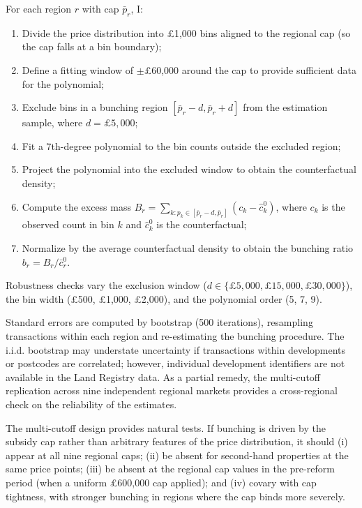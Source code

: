 \documentclass[12pt]{article}
\begin{document}
For each region $r$ with cap $\bar{p}_r$, I:
\begin{enumerate}
\item Divide the price distribution into \pounds1,000 bins aligned to the regional cap (so the cap falls at a bin boundary);
\item Define a fitting window of $\pm$\pounds60,000 around the cap to provide sufficient data for the polynomial;
\item Exclude bins in a bunching region $[\bar{p}_r - d, \bar{p}_r + d]$ from the estimation sample, where $d = \pounds5{,}000$;
\item Fit a 7th-degree polynomial to the bin counts outside the excluded region;
\item Project the polynomial into the excluded window to obtain the counterfactual density;
\item Compute the excess mass $B_r = \sum_{k: p_k \in [\bar{p}_r - d, \bar{p}_r]} (c_k - \hat{c}_k^0)$, where $c_k$ is the observed count in bin $k$ and $\hat{c}_k^0$ is the counterfactual;
\item Normalize by the average counterfactual density to obtain the bunching ratio $b_r = B_r / \bar{c}_r^0$.
\end{enumerate}

Robustness checks vary the exclusion window ($d \in \{\pounds5{,}000, \pounds15{,}000, \pounds30{,}000\}$), the bin width (\pounds500, \pounds1,000, \pounds2,000), and the polynomial order (5, 7, 9).

Standard errors are computed by bootstrap (500 iterations), resampling transactions within each region and re-estimating the bunching procedure. The i.i.d. bootstrap may understate uncertainty if transactions within developments or postcodes are correlated; however, individual development identifiers are not available in the Land Registry data. As a partial remedy, the multi-cutoff replication across nine independent regional markets provides a cross-regional check on the reliability of the estimates.

The multi-cutoff design provides natural tests. If bunching is driven by the subsidy cap rather than arbitrary features of the price distribution, it should (i) appear at all nine regional caps; (ii) be absent for second-hand properties at the same price points; (iii) be absent at the regional cap values in the pre-reform period (when a uniform \pounds600,000 cap applied); and (iv) covary with cap tightness, with stronger bunching in regions where the cap binds more severely.
\end{document}
